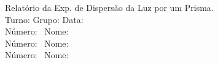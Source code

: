 \documentclass[a4paper,12pt]{article}  %
\author{Prof. Bernardo B. Carvalho}
\date{ Setembro 2015}
\newcommand{\HRule}{\rule{\linewidth}{0.5mm}}
\begin{document}
 



{  \sf \Large Relatório da Exp. de Dispersão da Luz por um Prisma.}\\ %
Turno:\underline{\makebox[0.7cm][l]{~}} Grupo:\underline{\makebox[0.7cm][l]{~}} Data:\underline{\makebox[1.2 cm][l]{~}}\\
\noindent Número:~\underline{\makebox[2cm][r]{~}} Nome:~\underline{\makebox[10cm][r]{~}} \\
\noindent Número:~\underline{\makebox[2cm][r]{~}} Nome:~\underline{\makebox[10cm][r]{~}} \\
\noindent Número:~\underline{\makebox[2cm][r]{~}} Nome:~\underline{\makebox[10cm][r]{~}} 


\end{document}

